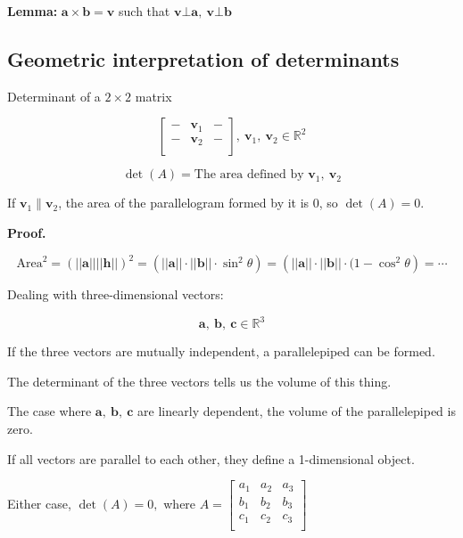 \documentclass[12pt]{article}
\theoremstyle{plain}
\theoremstyle{remark}
\theoremstyle{definition}
\begin{document}
\textbf{Lemma:}
\(\mathbf{a} \times \mathbf{b} = \mathbf{v}\) such that
\(\mathbf{v}\bot\mathbf{a},\ \mathbf{v}\bot\mathbf{b}\)


\subsection{Geometric interpretation of
determinants}

Determinant of a \(2 \times 2\) matrix

\[\begin{bmatrix}
 - & {\mathbf{v}}_{1} & - \\
 - & {\mathbf{v}}_{2} & - \\
\end{bmatrix},\ {\mathbf{v}}_{1},\ {\mathbf{v}}_{2} \in \mathbb{R}^{2}\]

\[\det(A) = \text{The\ area\ defined\ by\ }{\mathbf{v}}_{1},\ {\mathbf{v}}_{2}\]


If \({\mathbf{v}}_{1} \parallel {\mathbf{v}}_{2}\), the area of
the parallelogram formed by it is 0, so \(\det(A) = 0\).

\textbf{Proof.}

\[{\text{Area}^{2} = \left( \left| \left| \mathbf{a} \right| \right|\left| \left| \mathbf{h} \right| \right| \right)^{2} }{= \left( \left| \left| \mathbf{a} \right| \right| \cdot \left| \left| \mathbf{b} \right| \right| \cdot \sin^{2}\theta \right) }{= \left( \left| \left| \mathbf{a} \right| \right| \cdot \left| \left| \mathbf{b} \right| \right| \cdot (1 - \cos^{2}\theta \right) }{= \cdots} \]


Dealing with three-dimensional vectors:

\[\mathbf{a},\ \mathbf{b},\ \mathbf{c} \in \mathbb{R}^{3}\]

If the three vectors are mutually independent, a parallelepiped can be
formed.


The determinant of the three vectors tells us the volume of this thing.

The case where \(\mathbf{a},\ \mathbf{b},\ \mathbf{c}\) are
linearly dependent, the volume of the parallelepiped is zero.


If all vectors are parallel to each other, they define a 1-dimensional
object.


Either case, \(\det(A) = 0,\) where \(A = \begin{bmatrix}
a_{1} & a_{2} & a_{3} \\
b_{1} & b_{2} & b_{3} \\
c_{1} & c_{2} & c_{3} \\
\end{bmatrix}\)
\end{document}
